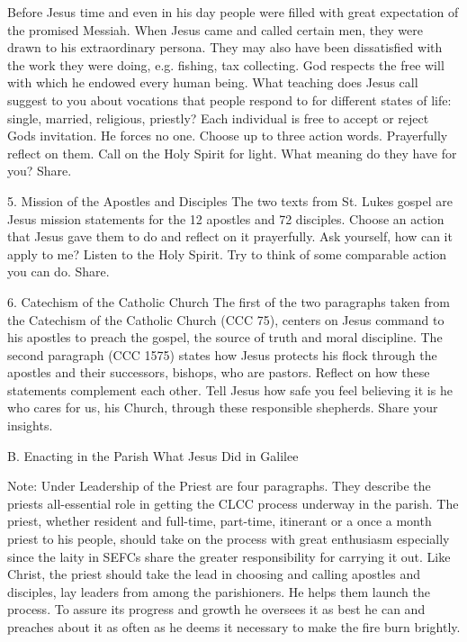 \documentclass[oneside]{book}
\begin{document}
Before Jesus time and even in his day people were filled with great expectation
of the promised Messiah. When Jesus came and called certain men, they were drawn
to his extraordinary persona. They may also have been dissatisfied with the work
they were doing, e.g. fishing, tax collecting. God respects the free will with
which he endowed every human being. What teaching does Jesus call suggest to you
about vocations that people respond to for different states of life: single,
married, religious, priestly? Each individual is free to accept or reject Gods
invitation. He forces no one. Choose up to three action words. Prayerfully
reflect on them. Call on the Holy Spirit for light. What meaning do they have
for you? Share.

5. Mission of the Apostles and Disciples The two texts from St. Lukes gospel are
Jesus mission statements for the 12 apostles and 72 disciples. Choose an action
that Jesus gave them to do and reflect on it prayerfully. Ask yourself, how can
it apply to me? Listen to the Holy Spirit. Try to think of some comparable
action you can do. Share.

6. Catechism of the Catholic Church The first of the two paragraphs taken from
the Catechism of the Catholic Church (CCC 75), centers on Jesus command to his
apostles to preach the gospel, the source of truth and moral discipline. The
second paragraph (CCC 1575) states how Jesus protects his flock through the
apostles and their successors, bishops, who are pastors. Reflect on how these
statements complement each other. Tell Jesus how safe you feel believing it is
he who cares for us, his Church, through these responsible shepherds. Share your
insights.

B. Enacting in the Parish What Jesus Did in Galilee

Note: Under Leadership of the Priest are four paragraphs. They describe the
priests all-essential role in getting the CLCC process underway in the
parish. The priest, whether resident and full-time, part-time, itinerant or a
once a month priest to his people, should take on the process with great
enthusiasm especially since the laity in SEFCs share the greater responsibility
for carrying it out. Like Christ, the priest should take the lead in choosing
and calling apostles and disciples, lay leaders from among the parishioners. He
helps them launch the process. To assure its progress and growth he oversees it
as best he can and preaches about it as often as he deems it necessary to make
the fire burn brightly.
\end{document}
